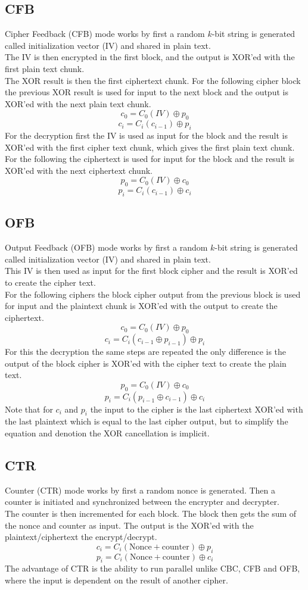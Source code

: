\documentclass[12pt, a4paper]{article}
\begin{document}
		\subsection{CFB}
			Cipher Feedback (CFB) mode works by first a random $k$-bit string is generated called initialization vector (IV) and shared in plain text.\\
			The IV is then encrypted in the first block, and the output is XOR'ed with the first plain text chunk.\\
			The XOR result is then the first ciphertext chunk. For the following cipher block the previous XOR result is used for input to the next block and the output is XOR'ed with the next plain text chunk.
			$$c_0=C_0(IV)\oplus p_0$$
			$$ c_i = C_i( c_{i-1})\oplus p_i$$
			For the decryption first the IV is used as input for the block and the result is XOR'ed with the first cipher text chunk, which gives the first plain text chunk.\\
			For the following the ciphertext is used for input for the block and the result is XOR'ed with the next ciphertext chunk.
			$$p_0=C_0(IV)\oplus c_0$$
			$$ p_i = C_i( c_{i-1})\oplus c_i$$
		\subsection{OFB}
			Output Feedback (OFB) mode works by first a random $k$-bit string is generated called initialization vector (IV) and shared in plain text.\\
			This IV is then used as input for the first block cipher and the result is XOR'ed to create the cipher text.\\
			For the following ciphers the block cipher output from the previous block is used for input and the plaintext chunk is XOR'ed with the output to create the ciphertext.
			$$c_0=C_0(IV)\oplus p_0$$
			$$ c_i = C_i( c_{i-1}\oplus p_{i-1})\oplus p_i$$
			For this the decryption the same steps are repeated the only difference is the output of the block cipher is XOR'ed with the cipher text to create the plain text.
			$$p_0=C_0(IV)\oplus c_0$$
			$$p_i = C_i( p_{i-1}\oplus c_{i-1})\oplus c_i$$
			Note that for $c_i$ and $p_i$ the input to the cipher is the last ciphertext XOR'ed with the last plaintext which is equal to the last cipher output, but to simplify the equation and denotion the XOR cancellation is implicit.\\
		\subsection{CTR}
			Counter (CTR) mode works by first a random nonce is generated. Then a counter is initiated and synchronized between the encrypter and decrypter.\\
			The counter is then incremented for each block. The block then gets the sum of the nonce and counter as input. The output is the XOR'ed with the plaintext/ciphertext the encrypt/decrypt.\\
			$$c_i=C_i(\text{Nonce} + \text{counter})\oplus p_i$$
			$$p_i=C_i(\text{Nonce} + \text{counter})\oplus c_i$$
			The advantage of CTR is the ability to run parallel unlike CBC, CFB and OFB, where the input is dependent on the result of another cipher.
			
\end{document}
